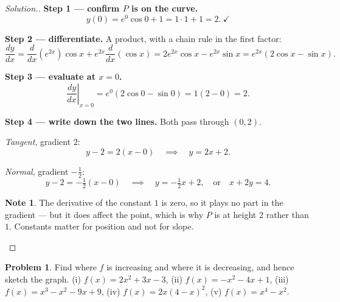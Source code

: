 \documentclass[11pt,a4paper]{article}
\theoremstyle{definition}
\newtheorem{note}[thm]{Note}
\newtheorem{problemx}{Problem}[section]
\newenvironment{problem}{\begin{problemx}}{\end{problemx}}
\newenvironment{solution}
  {\renewcommand{\qedsymbol}{}\begin{proof}[\textit{Solution}.]}
  {\end{proof}}
\let\amscheckmark\checkmark
\renewcommand{\checkmark}{\ensuremath{\amscheckmark}}
\begin{document}
\begin{solution}
\textbf{Step 1 --- confirm $P$ is on the curve.}
$$y(0)=e^0\cos 0+1=1\cdot 1+1=2.\ \checkmark$$

\textbf{Step 2 --- differentiate.} A product, with a chain rule in the first factor:
$$\frac{dy}{dx}=\frac{d}{dx}\left(e^{2x}\right)\cos x
+e^{2x}\frac{d}{dx}(\cos x)=2e^{2x}\cos x-e^{2x}\sin x
=e^{2x}\left(2\cos x-\sin x\right).$$

\textbf{Step 3 --- evaluate at $x=0$.}
$$\left.\frac{dy}{dx}\right|_{x=0}=e^0\left(2\cos 0-\sin 0\right)=1(2-0)=2.$$

\textbf{Step 4 --- write down the two lines.} Both pass through $(0,2)$.

\emph{Tangent}, gradient $2$:
$$y-2=2(x-0)\quad\implies\quad y=2x+2.$$

\emph{Normal}, gradient $-\frac{1}{2}$:
$$y-2=-\tfrac{1}{2}(x-0)\quad\implies\quad y=-\tfrac{1}{2}x+2,
\quad\text{or}\quad x+2y=4.$$

\begin{note}
The derivative of the constant $1$ is zero, so it plays no part in the gradient --- but
it does affect the point, which is why $P$ is at height $2$ rather than $1$. Constants
matter for position and not for slope.
\end{note}
\end{solution}

\begin{problem}
Find where $f$ is increasing and where it is decreasing, and hence sketch the graph.
\quad (i) $f(x)=2x^2+3x-3$, \quad (ii) $f(x)=-x^2-4x+1$, \quad
(iii) $f(x)=x^3-x^2-9x+9$, \quad (iv) $f(x)=2x(4-x)^2$, \quad (v) $f(x)=x^4-x^2$.
\end{problem}
\end{document}

